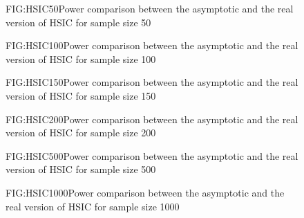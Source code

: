 \begin{figure}[HSIC asymptotic size 50]{FIG:HSIC50}{Power comparison between the asymptotic and the real version of HSIC for sample size 50}
\end{figure}
\begin{figure}[HSIC asymptotic size 100]{FIG:HSIC100}{Power comparison between the asymptotic and the real version of HSIC for sample size 100}
\end{figure}
\begin{figure}[HSIC asymptotic size 150]{FIG:HSIC150}{Power comparison between the asymptotic and the real version of HSIC for sample size 150}
\end{figure}
\begin{figure}[HSIC asymptotic size 200]{FIG:HSIC200}{Power comparison between the asymptotic and the real version of HSIC for sample size 200}
\end{figure}
\begin{figure}[HSIC asymptotic size 500]{FIG:HSIC500}{Power comparison between the asymptotic and the real version of HSIC for sample size 500}
\end{figure}
\begin{figure}[HSIC asymptotic size 1000]{FIG:HSIC1000}{Power comparison between the asymptotic and the real version of HSIC for sample size 1000}
\end{figure}

